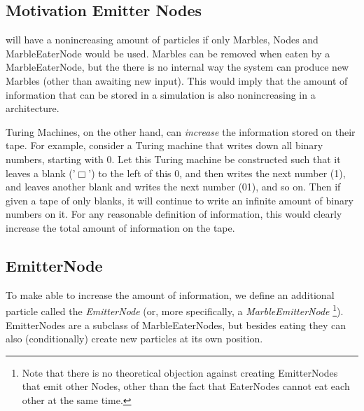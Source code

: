 \subsection{Motivation Emitter Nodes}
\nenwin will have a nonincreasing amount of particles if only Marbles, Nodes and MarbleEaterNode would be used.
Marbles can be removed when eaten by a MarbleEaterNode, 
but the there is no internal way the system can produce new Marbles (other than awaiting new input).
This would imply that the amount of information that can be stored in a \nenwin simulation is also nonincreasing in a \nenwin architecture.

Turing Machines, on the other hand, can \textit{increase} the information stored on their tape.
For example, consider a Turing machine that writes down all binary numbers, 
starting with 0. Let this Turing machine be constructed such that it leaves a blank ('$\Box$') to the left of this 0, 
and then writes the next number (1), and leaves another blank and writes the next number (01), and so on. 
Then if given a tape of only blanks, it will continue to write an infinite amount of binary numbers on it. 
For any reasonable definition of information, 
this would clearly increase the total amount of information on the tape. 

\subsection{EmitterNode}
To make \nenwin able to increase the amount of information, we define an additional particle called the \textit{EmitterNode}
(or, more specifically, a \textit{MarbleEmitterNode}
\footnote{Note that there is no theoretical objection against creating EmitterNodes that emit other Nodes, 
other than the fact that EaterNodes cannot eat each other at the same time.}). 
EmitterNodes are a subclass of MarbleEaterNodes, 
but besides eating they can also (conditionally) create new particles at its own position.

